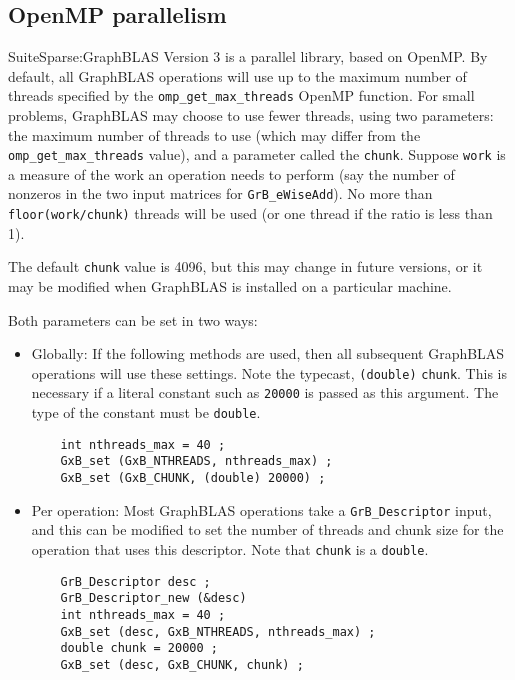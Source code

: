 \documentclass[12pt]{article}
\begin{document}
\subsection{OpenMP parallelism}

SuiteSparse:GraphBLAS Version 3 is a parallel library, based on OpenMP.  By
default, all GraphBLAS operations will use up to the maximum number of threads
specified by the \verb'omp_get_max_threads' OpenMP function.  For small
problems, GraphBLAS may choose to use fewer threads, using two parameters: the
maximum number of threads to use (which may differ from the
\verb'omp_get_max_threads' value), and a parameter called the \verb'chunk'.
Suppose \verb'work' is a measure of the work an operation needs to perform (say
the number of nonzeros in the two input matrices for \verb'GrB_eWiseAdd').  No
more than \verb'floor(work/chunk)' threads will be used (or one thread if the
ratio is less than 1).

The default \verb'chunk' value is 4096, but this may change in future versions,
or it may be modified when GraphBLAS is installed on a particular machine.

Both parameters can be set in two ways:

\begin{itemize}

\item Globally:  If the following methods are used, then all subsequent
GraphBLAS operations will use these settings.  Note the typecast,
\verb'(double)' \verb'chunk'.  This is necessary if a literal constant such as
\verb'20000' is passed as this argument.  The type of the constant must be
\verb'double'.

    {\footnotesize
    \begin{verbatim}
    int nthreads_max = 40 ;
    GxB_set (GxB_NTHREADS, nthreads_max) ;
    GxB_set (GxB_CHUNK, (double) 20000) ; \end{verbatim} }

\item Per operation:  Most GraphBLAS operations take a \verb'GrB_Descriptor'
input, and this can be modified to set the number of threads and chunk
size for the operation that uses this descriptor.  Note that \verb'chunk'
is a \verb'double'.

    {\footnotesize
    \begin{verbatim}
    GrB_Descriptor desc ;
    GrB_Descriptor_new (&desc) 
    int nthreads_max = 40 ;
    GxB_set (desc, GxB_NTHREADS, nthreads_max) ;
    double chunk = 20000 ;
    GxB_set (desc, GxB_CHUNK, chunk) ; \end{verbatim} }

\end{itemize}
\end{document}
